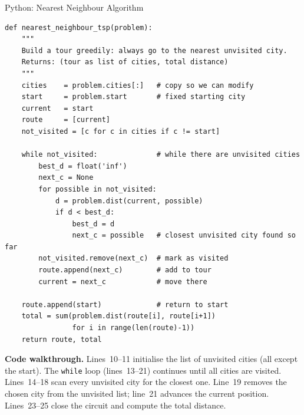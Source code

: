 \documentclass[aspectratio=169,10pt]{beamer}
\begin{document}
\begin{frame}[fragile]{Python: Nearest Neighbour Algorithm}

\begin{lstlisting}[caption={Nearest Neighbour heuristic --- Python translation of book Listing 1.2}]
def nearest_neighbour_tsp(problem):
    """
    Build a tour greedily: always go to the nearest unvisited city.
    Returns: (tour as list of cities, total distance)
    """
    cities    = problem.cities[:]   # copy so we can modify
    start     = problem.start       # fixed starting city
    current   = start
    route     = [current]
    not_visited = [c for c in cities if c != start]

    while not_visited:              # while there are unvisited cities
        best_d = float('inf')
        next_c = None
        for possible in not_visited:
            d = problem.dist(current, possible)
            if d < best_d:
                best_d = d
                next_c = possible   # closest unvisited city found so far
        not_visited.remove(next_c)  # mark as visited
        route.append(next_c)        # add to tour
        current = next_c            # move there

    route.append(start)             # return to start
    total = sum(problem.dist(route[i], route[i+1])
                for i in range(len(route)-1))
    return route, total
\end{lstlisting}

\textbf{Code walkthrough.}
Lines~10--11 initialise the list of unvisited cities (all except the
start).  The \texttt{while} loop (lines~13--21) continues until all
cities are visited.  Lines~14--18 scan every unvisited city for the
closest one.  Line~19 removes the chosen city from the unvisited list;
line~21 advances the current position.  Lines~23--25 close the circuit
and compute the total distance.

\end{frame}
\end{document}
